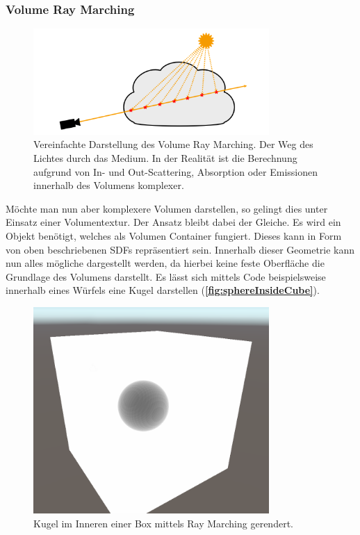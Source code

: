 



\subsubsection{Volume Ray Marching}

\begin{figure}[!h]
	\centering
	\includegraphics[width=0.80\textwidth]{Grafiken/Basics/Volume/Volume_RayMarching.png}
	\begin{footnotesize}
		\caption{Vereinfachte Darstellung des Volume Ray Marching. Der Weg des Lichtes durch
			das Medium. In der Realität ist die Berechnung aufgrund von In- und Out-Scattering, Absorption oder Emissionen innerhalb des
			Volumens komplexer.}
		\label{fig:volumeRayMarching}
	\end{footnotesize}
\end{figure}


Möchte man nun aber komplexere Volumen darstellen, so gelingt dies unter Einsatz einer Volumentextur. Der Ansatz bleibt dabei der Gleiche.
Es wird ein Objekt benötigt, welches als Volumen Container fungiert. Dieses kann in Form von oben beschriebenen SDFs repräsentiert sein.
Innerhalb dieser Geometrie kann nun alles mögliche dargestellt werden, da hierbei keine feste Oberfläche die Grundlage des
Volumens darstellt. Es lässt sich mittels Code beispielsweise innerhalb eines Würfels eine Kugel darstellen (\textbf{\autoref{fig:sphereInsideCube}}).

\begin{figure}[!h]
	\centering
	\includegraphics[width=0.80\textwidth]{Grafiken/Implementation/Raymarch/sphereInsideCube.png}
	\begin{footnotesize}
		\caption{Kugel im Inneren einer Box mittels Ray Marching gerendert.}
		\label{fig:sphereInsideCube}
	\end{footnotesize}
\end{figure}


